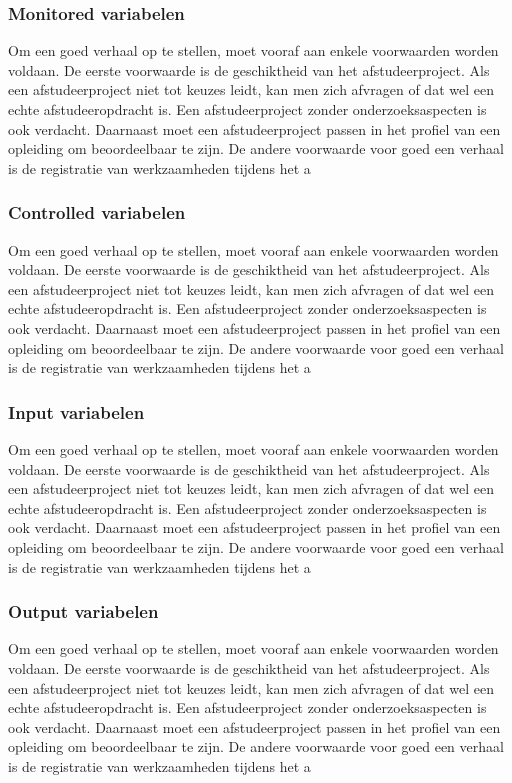 \subsubsection{Monitored variabelen}

Om een goed verhaal op te stellen, moet vooraf aan enkele voorwaarden
worden voldaan. De eerste voorwaarde is de geschiktheid van het
afstudeerproject. Als een afstudeerproject niet tot keuzes leidt, kan
men zich afvragen of dat wel een echte afstudeeropdracht is. Een
afstudeerproject zonder onderzoeksaspecten is ook verdacht. Daarnaast
moet een afstudeerproject passen in het profiel van een opleiding om
beoordeelbaar te zijn. De andere voorwaarde voor goed een verhaal is
de registratie van werkzaamheden tijdens het a
\subsubsection{Controlled variabelen}

Om een goed verhaal op te stellen, moet vooraf aan enkele voorwaarden
worden voldaan. De eerste voorwaarde is de geschiktheid van het
afstudeerproject. Als een afstudeerproject niet tot keuzes leidt, kan
men zich afvragen of dat wel een echte afstudeeropdracht is. Een
afstudeerproject zonder onderzoeksaspecten is ook verdacht. Daarnaast
moet een afstudeerproject passen in het profiel van een opleiding om
beoordeelbaar te zijn. De andere voorwaarde voor goed een verhaal is
de registratie van werkzaamheden tijdens het a
\subsubsection{Input variabelen}

Om een goed verhaal op te stellen, moet vooraf aan enkele voorwaarden
worden voldaan. De eerste voorwaarde is de geschiktheid van het
afstudeerproject. Als een afstudeerproject niet tot keuzes leidt, kan
men zich afvragen of dat wel een echte afstudeeropdracht is. Een
afstudeerproject zonder onderzoeksaspecten is ook verdacht. Daarnaast
moet een afstudeerproject passen in het profiel van een opleiding om
beoordeelbaar te zijn. De andere voorwaarde voor goed een verhaal is
de registratie van werkzaamheden tijdens het a
\subsubsection{Output variabelen}

Om een goed verhaal op te stellen, moet vooraf aan enkele voorwaarden
worden voldaan. De eerste voorwaarde is de geschiktheid van het
afstudeerproject. Als een afstudeerproject niet tot keuzes leidt, kan
men zich afvragen of dat wel een echte afstudeeropdracht is. Een
afstudeerproject zonder onderzoeksaspecten is ook verdacht. Daarnaast
moet een afstudeerproject passen in het profiel van een opleiding om
beoordeelbaar te zijn. De andere voorwaarde voor goed een verhaal is
de registratie van werkzaamheden tijdens het a


